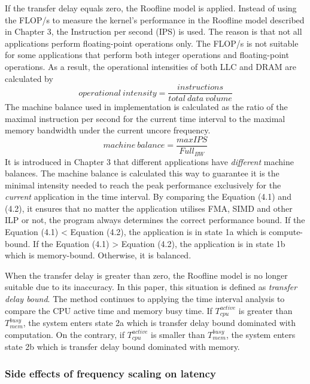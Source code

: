 If the transfer delay equals zero, the Roofline model is applied. Instead of using the FLOP/s to measure the kernel's performance in the Roofline model described in Chapter 3, the Instruction per second (IPS) is used. The reason is that not all applications perform floating-point operations only. The FLOP/s is not suitable for some applications that perform both integer operations and floating-point operations. As a result, the operational intensities of both LLC and DRAM are calculated by
\begin{equation}
operational\ intensity = \frac{instructions}{total\ data\ volume}
\end{equation}
The machine balance used in implementation is calculated as the ratio of the maximal instruction per second for the current time interval to the maximal memory bandwidth under the current uncore frequency. 
\begin{equation}
machine\ balance = \frac{maxIPS}{Full_{BW}}
\end{equation}
It is introduced in Chapter 3 that different applications have \textit{different} machine balances. The machine balance is calculated this way to guarantee it is the minimal intensity needed to reach the peak performance exclusively for the \textit{current} application in the time interval. By comparing the Equation (4.1) and (4.2), it ensures that no matter the application utilises FMA, SIMD and other ILP or not, the program always determines the correct performance bound. If the Equation (4.1) < Equation (4.2), the application is in state 1a which is compute-bound. If the Equation (4.1) > Equation (4.2), the application is in state 1b which is memory-bound. Otherwise, it is balanced.


When the transfer delay is greater than zero, the Roofline model is no longer suitable due to its inaccuracy. In this paper, this situation is defined as \textit{transfer delay bound}. The method continues to applying the time interval analysis to compare the CPU active time and memory busy time. If $T^{active}_{cpu}$ is greater than $T^{busy}_{mem}$, the system enters state 2a which is transfer delay bound dominated with computation. On the contrary, if $T^{active}_{cpu}$ is smaller than $T^{busy}_{mem}$, the system enters state 2b which is transfer delay bound dominated with memory.



\subsubsection{Side effects of frequency scaling on latency}

